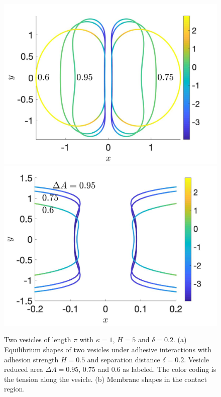 \documentclass[prf,superscriptaddress,showpacs]{revtex4-1}
\begin{document}
\begin{figure}
\includegraphics[keepaspectratio=true,scale=0.175]{figs/Dec18_vesicle_shape_vs_rA_00.jpeg}
\includegraphics[keepaspectratio=true,scale=0.175]{figs/Dec18_vesicle_shape_vs_rA_01.jpeg}
\caption{Two vesicles of length $\pi$ with $\kappa=1$, $H=5$ and
  $\delta=0.2$.  (a) Equilibrium shapes of two vesicles under adhesive
  interactions with adhesion strength $H=0.5$ and separation distance
  $\delta=0.2$.  Vesicle reduced area $\Delta A=0.95$, $0.75$ and $0.6$
  as labeled.  The color coding is the tension along the vesicle. (b)
  Membrane shapes in the contact region.}
\label{fig:Dec18_vesicle_shape}
\end{figure}
\end{document}
